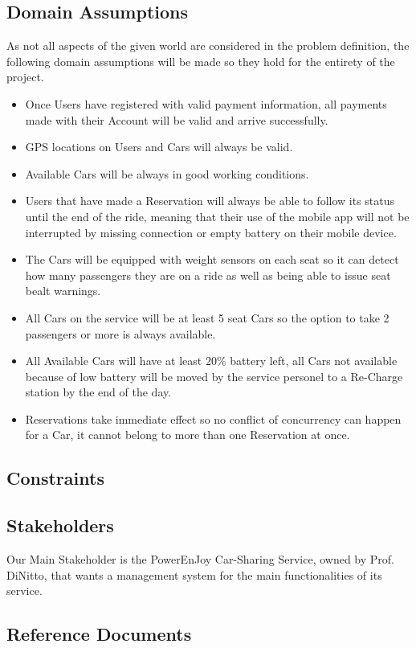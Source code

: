 \documentclass[a4paper]{article}
\begin{document}
\subsection{Domain Assumptions}
As not all aspects of the given world are considered in the problem definition, the following domain assumptions will be made so they hold for the entirety of the project.
\begin{itemize}
\item Once Users have registered with valid payment information, all payments made with their Account will be valid and arrive successfully.
\item GPS locations on Users and Cars will always be valid.
\item Available Cars will be always in good working conditions.
\item Users that have made a Reservation will always be able to follow its status until the end of the ride, meaning that their use of the mobile app will not be interrupted by missing connection or empty battery on their mobile device.
\item The Cars will be equipped with weight sensors on each seat so it can detect how many passengers they are on a ride as well as being able to issue seat bealt warnings.
\item All Cars on the service will be at least 5 seat Cars so the option to take 2 passengers or more is always available.
\item All Available Cars will have at least 20\% battery left, all Cars not available because of low battery will be moved by the service personel to a Re-Charge station by the end of the day. 
\item Reservations take immediate effect so no conflict of concurrency can happen for a Car, it cannot belong to more than one Reservation at once.
\end{itemize}
\subsection{Constraints}
\subsection{Stakeholders}
Our Main Stakeholder is the PowerEnJoy Car-Sharing Service, owned by Prof. DiNitto, that wants a management system for the main functionalities of its service.
\subsection{Reference Documents}
\end{document}
